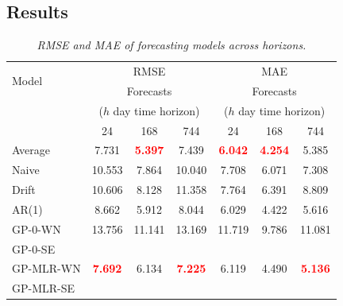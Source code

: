 \documentclass[a4paper, 10pt, fleqn]{article}
\begin{document}
\begin{flushleft}
      \subsection*{Results}

      \begin{table}[H]
         \centering
         \begin{tabular}{lcccccc}
         \hline
         \multirow{2}{*}{Model} & \multicolumn{3}{c}{RMSE} & \multicolumn{3}{c}{MAE} \\
         \cline{2-7}
         & \multicolumn{3}{c}{Forecasts} & \multicolumn{3}{c}{Forecasts} \\
         & \multicolumn{3}{c}{($h$ day time horizon)} & \multicolumn{3}{c}{($h$ day time horizon)} \\
         & 24 & 168 & 744 & 24 & 168 & 744 \\
         \hline
         Average & {7.731} & \textbf{\textcolor{red}{5.397}} & {7.439} & \textbf{\textcolor{red}{6.042}} & \textbf{\textcolor{red}{4.254}} & {5.385} \\
         Naive & {10.553} & {7.864} & {10.040} & {7.708} & {6.071} & {7.308} \\
         Drift & {10.606} & {8.128} & {11.358} & {7.764} & {6.391} & {8.809} \\
         AR(1) & {8.662} & {5.912} & {8.044} & {6.029} & {4.422} & {5.616} \\
         GP-0-WN & {13.756} & {11.141} & {13.169} & {11.719} & {9.786} & {11.081} \\
         GP-0-SE & {~} & {~} & {~} & {~} & {~} & {~} \\
         GP-MLR-WN & \textbf{\textcolor{red}{7.692}} & {6.134} & \textbf{\textcolor{red}{7.225}} & {6.119} & {4.490} & \textbf{\textcolor{red}{5.136}} \\
         GP-MLR-SE & {~} & {~} & {~} & {~} & {~} & {~} \\
         \hline
         \end{tabular}
         \caption{\textit{RMSE and MAE of forecasting models across horizons.}}
      \end{table}


\end{flushleft}
\end{document}
